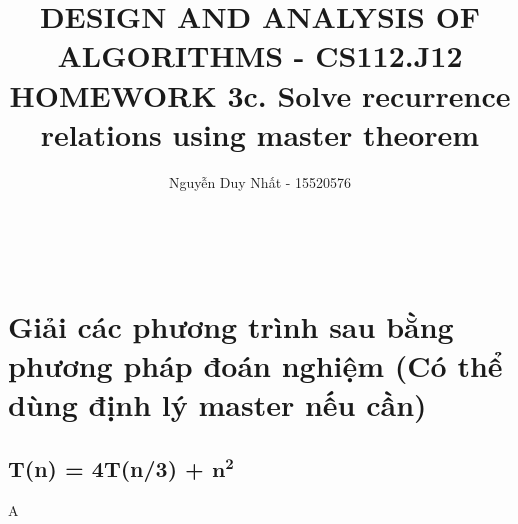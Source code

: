 \documentclass[13pt]{extarticle}
\title{DESIGN AND  ANALYSIS OF ALGORITHMS - CS112.J12  \\ HOMEWORK 3c. Solve recurrence relations using master theorem}
\author{Nguyễn Duy Nhất - 15520576}
\makeatletter
\renewcommand{\maketitle}{\bgroup\setlength{\parindent}{0pt}
		\large\textbf{\@title} \\
		\normalsize\@author
}
\makeatother
\begin{document}
\setlength{\abovedisplayskip}{0pt}
\setlength{\belowdisplayskip}{0pt}
\maketitle 

\section{Giải các phương trình sau bằng phương pháp đoán nghiệm (Có thể dùng định lý master nếu cần)}
\subsection{\normalsize T(n) = 4T(n/3) + $\mathbf{n^2}$}

\begin{mybox}
	A	
\end{mybox}
\end{document}
